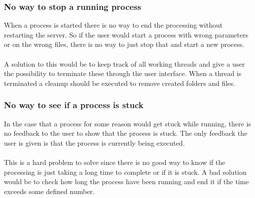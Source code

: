 \subsubsection{No way to stop a running process}
When a process is started there is no way to end the processing without restarting the server. So if the user would start a process with wrong parameters or on the wrong files, there is no way to just stop that and start a new process.\\
\\
A solution to this would be to keep track of all working threads and give a user the possibility to terminate these through the user interface. When a thread is terminated a cleanup should be executed to remove created folders and files.
\subsubsection{No way to see if a process is stuck}
In the case that a process for some reason would get stuck while running, there is no feedback to the user to show that the process is stuck. The only feedback the user is given is that the process is currently being executed.\\
\\
This is a hard problem to solve since there is no good way to know if the processing is just taking a long time to complete or if it is stuck. A bad solution would be to check how long the process have been running and end it if the time exceeds some defined number.
